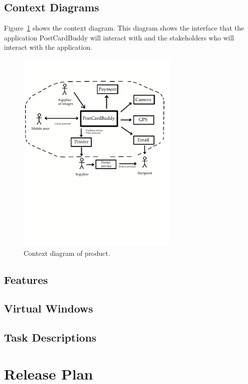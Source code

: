 \documentclass[10pt,a4paper]{article}
\begin{document}
\subsection{Context Diagrams}
Figure~\ref{fig:context} shows the context diagram. This diagram shows the interface that the application PostCardBuddy will interact with and the stakeholders who will interact with the application.

\begin{figure}[h!]
\centering
\includegraphics[width=0.7\textwidth]{ContextDiagram2.pdf}
\caption{Context diagram of product.}
\label{fig:context}
\end{figure}

\subsection{Features}
\subsection{Virtual Windows}
\subsection{Task Descriptions}



\section{Release Plan}
\end{document}
